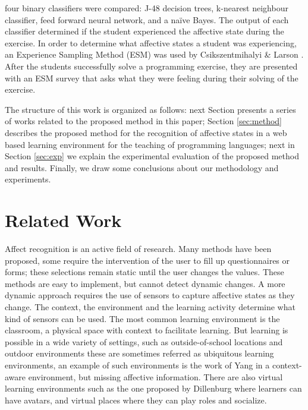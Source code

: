 \documentclass[a4paper,twoside]{article}
\begin{document}
four binary classifiers were compared: J-48 decision trees, k-nearest neighbour
classifier, feed forward neural network, and a na\"ive Bayes. The output of each
classifier determined if the student experienced the affective state during the
exercise.
%
%
In order to determine what
affective states a student was experiencing, an Experience Sampling Method (ESM)
was used by Csikszentmihalyi \& Larson \cite{kubey1996experience}. After the students successfully
solve a programming exercise, they are presented with an ESM survey that asks
what they were feeling during their solving of the exercise.


The structure of this work is organized as follows: next Section 
presents a series of works related to the proposed method in this paper; Section
\ref{sec:method} describes the proposed method for the recognition of affective
states in a web based learning environment for the teaching of programming
languages; next in Section \ref{sec:exp} we explain the experimental evaluation of the
proposed method and results.
Finally, we draw some conclusions about our methodology and
experiments. 


\section{Related Work}

Affect recognition is an active field of research. Many
methods have been proposed, some require the intervention of the user to fill up
questionnaires or forms; these selections remain static until the user changes
the values. These methods are easy to implement, but cannot detect dynamic
changes.  A more dynamic approach requires the use of sensors to capture
affective states as they change. The context, the environment and the learning
activity determine what kind of sensors can be used. The most common learning
environment is the classroom, a physical space with context to facilitate
learning. But learning is possible in a wide variety of settings, such as
outside-of-school locations and outdoor environments these are sometimes
referred as ubiquitous learning environments, an example of such environments is
the work of Yang \cite{yang2006context} in a context-aware environment, but missing affective
information. There are also virtual learning environments such as the one proposed by Dillenburg
\cite{dillenbourg2002virtual}  where learners can have avatars, and virtual places
where they can play roles and socialize.
\end{document}
